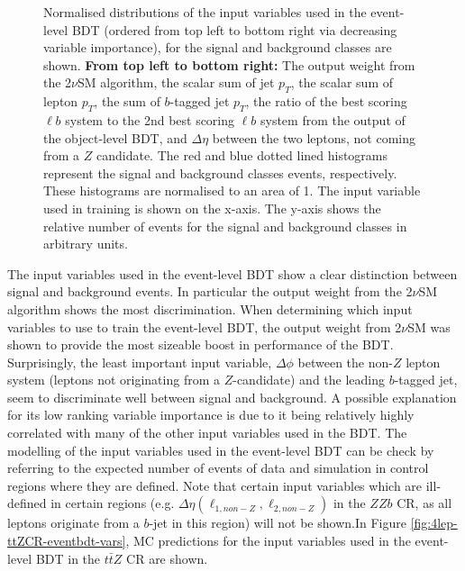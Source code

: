 \begin{figure}[h!]
    \caption{Normalised distributions of the input variables used in the event-level BDT (ordered from top left to bottom right via decreasing variable importance), for the signal and background classes are shown. \textbf{From top left to bottom right:} The output weight from the 2$\nu$SM algorithm, the scalar sum of jet $p_{T}$, the scalar sum of lepton $p_{T}$, the sum of $b$-tagged jet $p_{T}$, the ratio of the best scoring $\ell b$ system to the 2nd best scoring $\ell b$ system from the output of the object-level BDT, and $\Delta \eta$ between the two leptons, not coming from a $Z$ candidate. The red and blue dotted lined histograms represent the signal and background classes events, respectively. These histograms are normalised to an area of 1. The input variable used in training is shown on the x-axis. The y-axis shows the relative number of events for the signal and background classes in arbitrary units. }
    \label{fig:norm-event-bdt-vars}
\end{figure}
The input variables used in the event-level BDT show a clear distinction between signal and background events. In particular the output weight from the 2$\nu$SM algorithm shows the most discrimination. When determining which input variables to use to train the event-level BDT, the output weight from 2$\nu$SM was shown to provide the most sizeable boost in performance of the BDT. Surprisingly, the least important input variable, $\Delta \phi$ between the non-$Z$ lepton system (leptons not originating from a $Z$-candidate) and the leading $b$-tagged jet, seem to discriminate well between signal and background. A possible explanation for its low ranking variable importance is due to it being relatively highly correlated with many of the other input variables used in the BDT. The modelling of the input variables used in the event-level BDT can be check by referring to the expected number of events of data and simulation in control regions where they are defined. Note that certain input variables which are ill-defined in certain regions (e.g. $\Delta \eta (\ell_{1,non-Z}, \ell_{2,non-Z})$ in the $ZZb$ CR, as all leptons originate from a $b$-jet in this region) will not be shown.In Figure \ref{fig:4lep-ttZCR-eventbdt-vars}, MC predictions for the input variables used in the event-level BDT in the $t\bar{t}Z$ CR are shown.
